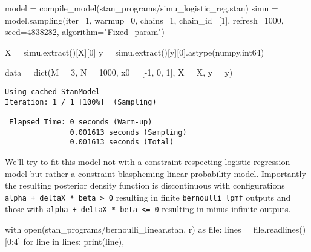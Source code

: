 \documentclass[
  letterpaper,
  DIV=11,
  numbers=noendperiod]{scrartcl}
\newenvironment{Shaded}{\begin{snugshade}}{\end{snugshade}}
\newcommand{\BuiltInTok}[1]{\textcolor[rgb]{0.00,0.23,0.31}{#1}}
\newcommand{\ControlFlowTok}[1]{\textcolor[rgb]{0.00,0.23,0.31}{#1}}
\newcommand{\DecValTok}[1]{\textcolor[rgb]{0.68,0.00,0.00}{#1}}
\newcommand{\ImportTok}[1]{\textcolor[rgb]{0.00,0.46,0.62}{#1}}
\newcommand{\KeywordTok}[1]{\textcolor[rgb]{0.00,0.23,0.31}{#1}}
\newcommand{\NormalTok}[1]{\textcolor[rgb]{0.00,0.23,0.31}{#1}}
\newcommand{\OperatorTok}[1]{\textcolor[rgb]{0.37,0.37,0.37}{#1}}
\newcommand{\StringTok}[1]{\textcolor[rgb]{0.13,0.47,0.30}{#1}}
\begin{document}
\begin{Shaded}
\begin{Highlighting}[]
\NormalTok{model }\OperatorTok{=}\NormalTok{ compile\_model(}\StringTok{\textquotesingle{}stan\_programs/simu\_logistic\_reg.stan\textquotesingle{}}\NormalTok{)}
\NormalTok{simu }\OperatorTok{=}\NormalTok{ model.sampling(}\BuiltInTok{iter}\OperatorTok{=}\DecValTok{1}\NormalTok{, warmup}\OperatorTok{=}\DecValTok{0}\NormalTok{, chains}\OperatorTok{=}\DecValTok{1}\NormalTok{, chain\_id}\OperatorTok{=}\NormalTok{[}\DecValTok{1}\NormalTok{],}
\NormalTok{                      refresh}\OperatorTok{=}\DecValTok{1000}\NormalTok{, seed}\OperatorTok{=}\DecValTok{4838282}\NormalTok{, algorithm}\OperatorTok{=}\StringTok{"Fixed\_param"}\NormalTok{)}

\NormalTok{X }\OperatorTok{=}\NormalTok{ simu.extract()[}\StringTok{\textquotesingle{}X\textquotesingle{}}\NormalTok{][}\DecValTok{0}\NormalTok{]}
\NormalTok{y }\OperatorTok{=}\NormalTok{ simu.extract()[}\StringTok{\textquotesingle{}y\textquotesingle{}}\NormalTok{][}\DecValTok{0}\NormalTok{].astype(numpy.int64)}

\NormalTok{data }\OperatorTok{=} \BuiltInTok{dict}\NormalTok{(M }\OperatorTok{=} \DecValTok{3}\NormalTok{, N }\OperatorTok{=} \DecValTok{1000}\NormalTok{, x0 }\OperatorTok{=}\NormalTok{ [}\OperatorTok{{-}}\DecValTok{1}\NormalTok{, }\DecValTok{0}\NormalTok{, }\DecValTok{1}\NormalTok{], X }\OperatorTok{=}\NormalTok{ X, y }\OperatorTok{=}\NormalTok{ y)}
\end{Highlighting}
\end{Shaded}

\begin{verbatim}
Using cached StanModel
Iteration: 1 / 1 [100%]  (Sampling)

 Elapsed Time: 0 seconds (Warm-up)
               0.001613 seconds (Sampling)
               0.001613 seconds (Total)
\end{verbatim}

We'll try to fit this model not with a constraint-respecting logistic
regression model but rather a constraint blaspheming linear probability
model. Importantly the resulting posterior density function is
discontinuous with configurations
\texttt{alpha\ +\ deltaX\ *\ beta\ \textgreater{}\ 0} resulting in
finite \texttt{bernoulli\_lpmf} outputs and those with
\texttt{alpha\ +\ deltaX\ *\ beta\ \textless{}=\ 0} resulting in minus
infinite outputs.

\begin{Shaded}
\begin{Highlighting}[]
\ControlFlowTok{with} \BuiltInTok{open}\NormalTok{(}\StringTok{\textquotesingle{}stan\_programs/bernoulli\_linear.stan\textquotesingle{}}\NormalTok{, }\StringTok{\textquotesingle{}r\textquotesingle{}}\NormalTok{) }\ImportTok{as} \BuiltInTok{file}\NormalTok{:}
\NormalTok{  lines }\OperatorTok{=} \BuiltInTok{file}\NormalTok{.readlines()[}\DecValTok{0}\NormalTok{:}\DecValTok{4}\NormalTok{]}
  \ControlFlowTok{for}\NormalTok{ line }\KeywordTok{in}\NormalTok{ lines:}
    \BuiltInTok{print}\NormalTok{(line),}
\end{Highlighting}
\end{Shaded}
\end{document}
